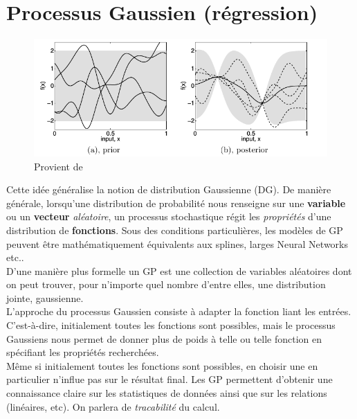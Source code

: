 \documentclass[a4paper,12pt]{report}
\numberwithin{equation}{section} %
\begin{document}
 
\pagebreak
\section{Processus Gaussien (régression)}

\begin{figure}[!ht]
\centering 
\includegraphics[scale=0.5]{fig_ramuss_1.png} 
\caption{Provient de \citep{rasmussen2006gaussian}}
\label{ramuss_1}
\end{figure}

Cette idée généralise la notion de distribution Gaussienne (DG). De manière générale, lorsqu'une distribution de probabilité nous renseigne sur une \textbf{variable} ou un \textbf{vecteur} \textit{aléatoire}, un processus stochastique régit les \textit{propriétés} d'une distribution de \textbf{fonctions}. Sous des conditions particulières, les modèles de GP peuvent être mathématiquement équivalents aux splines, larges Neural Networks etc.. \\ 
D'une manière plus formelle un GP est une collection de variables aléatoires dont on peut trouver, pour n'importe quel nombre d'entre elles, une distribution jointe, gaussienne.\\
L'approche du processus Gaussien consiste à adapter la fonction liant les entrées. C'est-à-dire, initialement toutes les fonctions sont possibles, mais le processus Gaussiens nous permet de donner plus de poids à telle ou telle fonction en spécifiant les propriétés recherchées.\\
Même si initialement toutes les fonctions sont possibles, en choisir une en particulier n'influe pas sur le résultat final. Les GP permettent d'obtenir une connaissance claire sur les statistiques de données ainsi que sur les relations (linéaires, etc). On parlera de \textit{tracabilité} du calcul. \\
\end{document}
